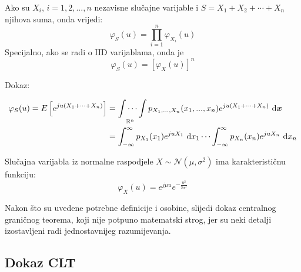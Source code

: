 \begin{property}
  Ako su $X_i$, $i=1,2,...,n$ nezavisne slučajne varijable i
  $S=X_1+X_2+\cdots+X_n$ njihova suma, onda vrijedi:
  \begin{equation}
    \varphi_S(u) = \prod_{i=1}^{n} \varphi_{X_i}(u)
  \end{equation}
  Specijalno, ako se radi o IID varijablama, onda je
  \begin{equation} \label{eq:char-power}
    \varphi_S(u) = [\varphi_X(u)]^n
  \end{equation}
\end{property}

Dokaz:

\begin{align}
  \varphi_S(u) = E\left[e^{ju(X_1+\cdots+X_n)}\right]
  &= \idotsint\limits_{\mathbb{R}^n}
    p_{X_1,...,X_n}(x_1,...,x_n) e^{ju(X_1+\cdots+X_n)} \ \text d\bm x \nonumber \\
  &= \int_{-\infty}^{\infty} p_{X_1}(x_1)e^{juX_1}\ \mathrm dx_1 \cdots
    \int_{-\infty}^{\infty} p_{X_n}(x_n)e^{juX_n}\ \mathrm dx_n
\end{align}

\begin{property}
  Slučajna varijabla iz normalne raspodjele $X \sim \mathcal{N}(\mu, \sigma^2)$
  ima karakterističnu funkciju: %
  \begin{equation} \label{eq:char-norm}
    \varphi_X(u) = e^{j\mu u} e^{-\frac{u^2}{2\sigma^2}}
  \end{equation}
\end{property}

Nakon što su uvedene potrebne definicije i osobine, slijedi dokaz centralnog
graničnog teorema, koji nije potpuno matematski strog, jer su neki detalji
izostavljeni radi jednostavnijeg razumijevanja. \\

\subsection*{Dokaz CLT}

